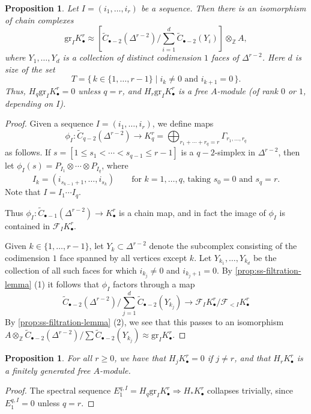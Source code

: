 \documentclass[11pt]{amsart}
\numberwithin{equation}{section}
\theoremstyle{plain}
\newtheorem{prop}[subsection]{Proposition}
\theoremstyle{remark}
\theoremstyle{plain}
\begin{document}
\begin{prop}
Let $I=(i_1,\dots,i_r)$ be a sequence.  Then there is an isomorphism
of chain complexes
\[
{\mathrm{gr}}_I K^r_\bullet \approx
\left[\widetilde{C}_{\bullet-2}(\Delta^{r-2})/
  \sum_{i=1}^d\widetilde{C}_{\bullet-2}(Y_i)\right]\otimes_{\mathbb{Z}}    A,
\]
where $Y_1,\dots,Y_d$ is a collection of distinct codimension $1$ faces of
$\Delta^{r-2}$.  Here $d$ is size of the set 
\[
T={{\{\,{k\in\{1,\dots,r-1\}}\mid{\text{$i_k\neq 0$ and $i_{k+1}=0$}}\,\}}}.
\]
Thus, $H_q{\mathrm{gr}}_I K_\bullet^r=0$ unless $q=r$, and $H_r{\mathrm{gr}}_I
K_\bullet^r$ is a free $A$-module (of rank $0$ or $1$, depending on $I$).
\end{prop}
\begin{proof}
Given a sequence $I=(i_1,\dots,i_r)$, we define maps 
\[
\phi_I\colon \widetilde{C}_{q-2}(\Delta^{r-2}){\rightarrow} K_q^r= \bigoplus_{r_1+\cdots+r_q=r}
\Gamma_{r_1,\dots,r_q}
\]
as follows.  If  $s=[1\leq s_1<\cdots<s_{q-1}\leq r-1]$ is a $q-2$-simplex
in 
$\Delta^{r-2}$, then let $\phi_I(s) = P_{I_1}\otimes \cdots \otimes
P_{I_q}$, where 
\[
I_k = (i_{s_{k-1}+1},\dots,i_{s_k})\qquad\text{for $k=1,\dots,q$,
  taking $s_0=0$ and $s_q=r$.}
\]
Note that $I=I_1\cdots I_q$.

Thus $\phi_I\colon
\widetilde{C}_{\bullet-1}(\Delta^{r-2}){\rightarrow} K_\bullet^r$ is a chain map,
and in fact the image of $\phi_I$ is contained in
${\mathscr{F}}_I K_\bullet^r$.   

Given $k\in \{1,\dots,r-1\}$, let $Y_k\subset \Delta^{r-2}$ denote
the subcomplex consisting of 
the codimension $1$ face spanned by all vertices except $k$.  Let
$Y_{k_1},\dots,Y_{k_d}$ be the collection of all such faces for which
$i_{k_j}\neq 0$ and
$i_{k_j+1}=0$.  By \eqref{prop:ss-filtration-lemma} (1) it follows that
$\phi_I$ factors through a map 
\[
\widetilde{C}_{\bullet-2}(\Delta^{r-2})/\sum_{j=1}^d
\widetilde{C}_{\bullet-2}(Y_{k_j}) {\rightarrow} 
{\mathscr{F}}_IK_\bullet^r/ {\mathscr{F}}_{<I}K_\bullet^r
\]
By \eqref{prop:ss-filtration-lemma} (2), we see that this passes to an
isomorphism $A\otimes_{\mathbb{Z}} \widetilde{C}_{\bullet-2}(\Delta^{r-2})/\sum
\widetilde{C}_{\bullet-2}(Y_{k_j})\approx 
{\mathrm{gr}}_IK_\bullet^r$.
\end{proof}

\begin{prop}\label{prop:koszul-for-ss}
For all $r\geq0$, we have that $H_jK_\bullet^r=0$ if $j\neq r$, and
that $H_rK_\bullet^r$ is a finitely generated free $A$-module.
\end{prop}
\begin{proof}
The spectral sequence $E_1^{q,I}=H_q{\mathrm{gr}}_I K_\bullet^r \Longrightarrow
H_*K_\bullet^r$ collapses trivially, since $E_1^{q,I}=0$ unless $q=r$.
\end{proof}
\end{document}
